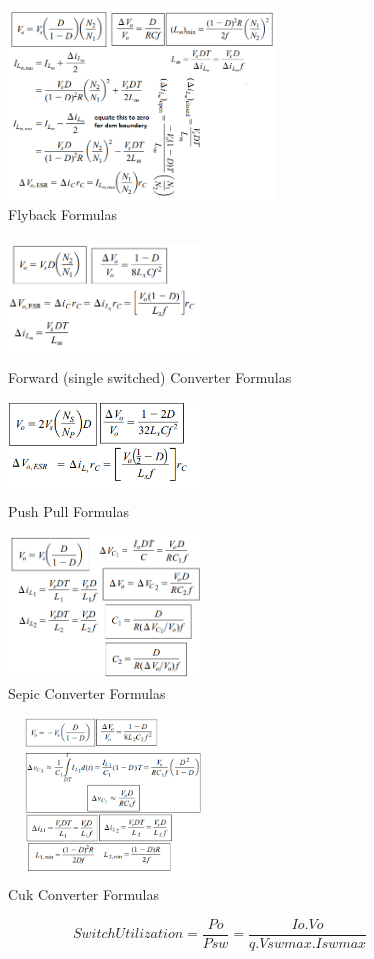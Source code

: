 \documentclass[twocolumn, ]{article}
\begin{document}
\begin{figure}[!ht]
	\includegraphics[width=2.8in,height=2in]{flybackformulasfromhart.png}
	\caption{Flyback Formulas}
\end{figure}
\begin{figure}[!ht]
	\includegraphics[width=2in,height=1.3in]{forwardsingleswitch.png}
	\caption{Forward (single switched) Converter Formulas}
\end{figure}
\begin{figure}[!ht]
	\includegraphics[width=2in,height=1in]{pushpull_someformulas.png}
	\caption{Push Pull Formulas}
\end{figure}
\begin{figure}[!ht]
	\includegraphics[width=2in,height=1.5in]{sepicformulas.png}
	\caption{Sepic Converter Formulas}
\end{figure}
\begin{figure}[!ht]
	\includegraphics[width=2.2in,height=1.7in]{cukformulas.png}
	\caption{Cuk Converter Formulas}
\end{figure}

\begin{equation}
Switch Utilization= \frac{Po}{Psw}=\frac{Io.Vo}{q.Vswmax.Iswmax}
\end{equation}
\end{document}
